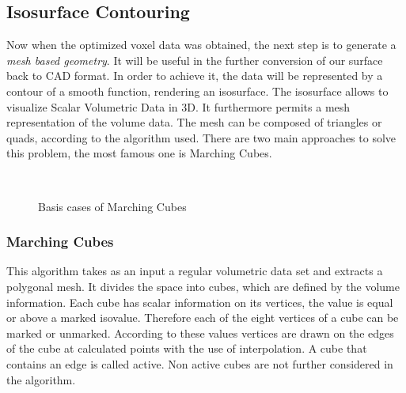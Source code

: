\subsection{Isosurface Contouring}
Now when the optimized voxel data was obtained, the next step is to generate a \emph{mesh based
geometry}. It will be useful in the further conversion of our surface back to CAD format. In order to achieve it, the
data will be represented by a contour of a smooth function, rendering an isosurface. The
isosurface allows to visualize Scalar Volumetric Data in 3D. It furthermore permits a mesh
representation of the volume data. The mesh can be composed of triangles or quads, according
to the algorithm used. There are two main approaches to solve this problem, the most
famous one is Marching Cubes.

\begin{figure}
\centering
   \\
   \caption{Basis cases of Marching Cubes}
\end{figure}

\subsubsection{Marching Cubes} 

This algorithm takes as an input a regular volumetric data set and extracts a polygonal mesh. It
divides the space into cubes, which are defined by the volume information. Each cube has scalar
information on its vertices, the value is equal or above a marked isovalue. Therefore each of the
eight vertices of a cube can be marked or unmarked. According to these values vertices are drawn
on the edges of the cube at calculated points with the use of interpolation. A cube that contains
an edge is called active. Non active cubes are not further considered in the algorithm.

